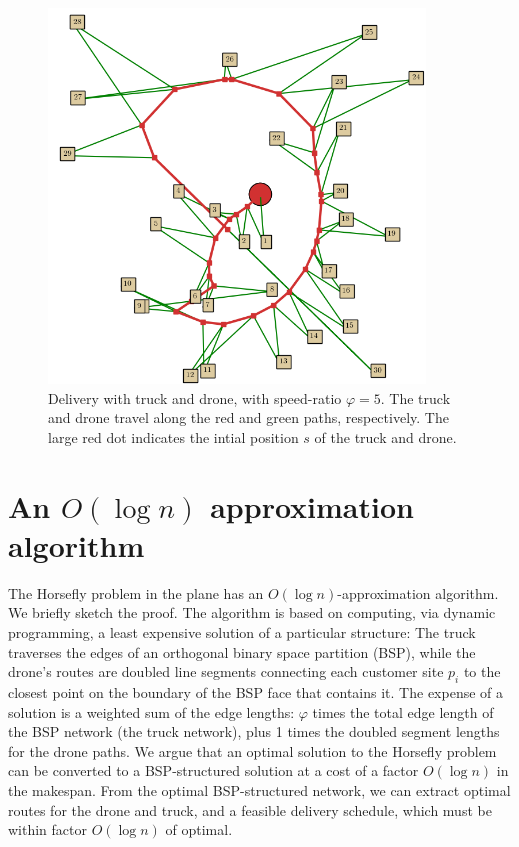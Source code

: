 \documentclass[conference]{IEEEtran}
\newcommand{\old}[1]{{}}
\begin{document}
\begin{figure}
\includegraphics[width=10cm]{img/prelim_example_phi5.png}
\caption{Delivery with truck and drone, with speed-ratio $\varphi=5$.
  The truck and drone travel along the red and green paths, respectively.
  The large red dot indicates the intial position $s$ of the truck and drone.}
\label{fig:example}
\end{figure}

\section{An $O(\log n)$ approximation algorithm}

\old{
  \begin{theorem}
  \label{thm:approx}
  The Horsefly problem in the plane has an $O(\log n)$-approximation algorithm.
\end{theorem}
}

The Horsefly problem in the plane has an $O(\log n)$-approximation algorithm.
%
We briefly sketch the proof.  The algorithm is based on computing, via
dynamic programming, a least expensive solution of a particular
structure: The truck traverses the edges of an orthogonal binary space
partition (BSP), while the drone's routes are doubled line segments
connecting each customer site $p_i$ to the closest point on the
boundary of the BSP face that contains it. The expense of a solution
is a weighted sum of the edge lengths: $\varphi$ times the total edge
length of the BSP network (the truck network), plus 1 times the
doubled segment lengths for the drone paths.  We argue that an optimal
solution to the Horsefly problem can be converted to a BSP-structured
solution at a cost of a factor $O(\log n)$ in the makespan. From the
optimal BSP-structured network, we can extract optimal routes for the
drone and truck, and a feasible delivery schedule, which must be
within factor $O(\log n)$ of optimal.
\end{document}

